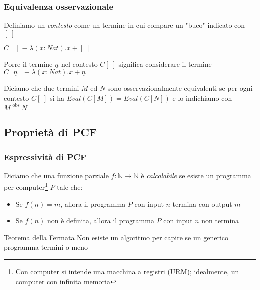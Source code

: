 \documentclass{beamer}
\newcommand{\eqobs}{\stackrel{\text{obs}}{=}}
\begin{document}
\begin{frame}
	
	\frametitle{Equivalenza osservazionale}
	
	Definiamo un \emph{contesto} come un termine in cui compare un "buco" indicato con $[\;]$
	
	\begin{example}
		$C[\;] \equiv \lambda (x:Nat).x+[\;]$
		
		Porre il termine $\underline{n}$ nel contesto $C[\;]$ significa considerare il termine
		$C[\underline{n}] \equiv \lambda (x:Nat).x+\underline{n}$
	\end{example}
	
	Diciamo che due termini $M$ ed $N$ sono osservazionalmente equivalenti se per ogni contesto $C[\;]$ si ha $Eval(C[M])=Eval(C[N])$
	e lo indichiamo con $M\eqobs N$
	
\end{frame}




\subsection{Proprietà di PCF}
\begin{frame}
	
	\frametitle{Espressività di PCF}
	
	Diciamo che una funzione parziale $f:\mathbb{N}\rightarrow \mathbb{N}$ è \emph{calcolabile} se esiste un programma per computer\footnote{Con computer si intende una macchina a registri (URM); idealmente, un computer con infinita memoria} $P$ tale che:
	\begin{itemize}
		\item Se $f(n)=m$, allora il programma $P$ con input $n$ termina con output $m$
		\item Se $f(n)$ non è definita, allora il programma $P$ con input $n$ non termina
	\end{itemize}
	
	
	
	\begin{block}{Teorema della Fermata}
		Non esiste un algoritmo per capire se un generico programma termini o meno
	\end{block}

	
\end{frame}
\end{document}
